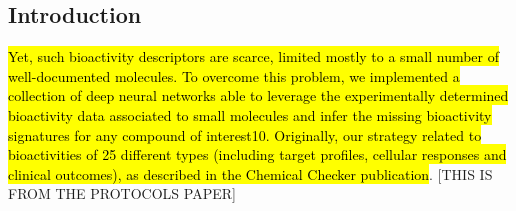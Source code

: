 \subsection{Introduction}


\hl{Yet, such bioactivity descriptors are scarce, limited mostly to a small number of well-documented molecules. To overcome this problem, we implemented a collection of deep neural networks able to leverage the experimentally determined bioactivity data associated to small molecules and infer the missing bioactivity signatures for any compound of interest10. Originally, our strategy related to bioactivities of 25 different types (including target profiles, cellular responses and clinical outcomes), as described in the Chemical Checker publication}\cite{duran-frigola_extending_2020}. [THIS IS FROM THE PROTOCOLS PAPER]


